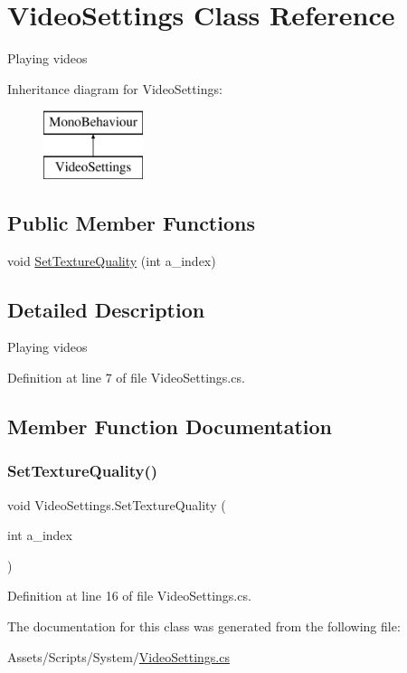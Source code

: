 \hypertarget{class_video_settings}{}\section{Video\+Settings Class Reference}
\label{class_video_settings}


Playing videos  


Inheritance diagram for Video\+Settings\+:\begin{figure}[H]
\begin{center}
\leavevmode
\includegraphics[height=2.000000cm]{class_video_settings}
\end{center}
\end{figure}
\subsection*{Public Member Functions}
\begin{DoxyCompactItemize}
\item 
void \mbox{\hyperlink{class_video_settings_a0c932d42a24b8875d490c9ee11b83f8c}{Set\+Texture\+Quality}} (int a\+\_\+index)
\end{DoxyCompactItemize}


\subsection{Detailed Description}
Playing videos 



Definition at line 7 of file Video\+Settings.\+cs.



\subsection{Member Function Documentation}
\mbox{\label{class_video_settings_a0c932d42a24b8875d490c9ee11b83f8c}} 
\subsubsection{\texorpdfstring{Set\+Texture\+Quality()}{SetTextureQuality()}}
{\footnotesize\ttfamily void Video\+Settings.\+Set\+Texture\+Quality (\begin{DoxyParamCaption}\item[{int}]{a\+\_\+index }\end{DoxyParamCaption})}



Definition at line 16 of file Video\+Settings.\+cs.



The documentation for this class was generated from the following file\+:\begin{DoxyCompactItemize}
\item 
Assets/\+Scripts/\+System/\mbox{\hyperlink{_video_settings_8cs}{Video\+Settings.\+cs}}\end{DoxyCompactItemize}

